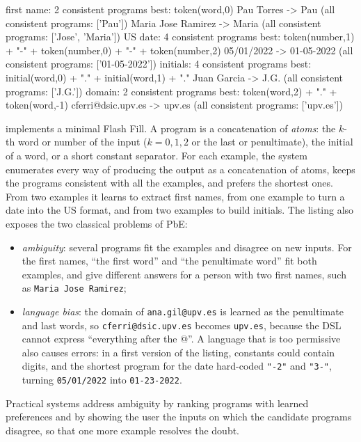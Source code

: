 \begin{pyoutput}
first name: 2 consistent programs
    best: token(word,0)
    Pau Torres -> Pau   (all consistent programs: ['Pau'])
    Maria Jose Ramirez -> Maria   (all consistent programs: ['Jose', 'Maria'])
US date: 4 consistent programs
    best: token(number,1) + "-" + token(number,0) + "-" + token(number,2)
    05/01/2022 -> 01-05-2022   (all consistent programs: ['01-05-2022'])
initials: 4 consistent programs
    best: initial(word,0) + "." + initial(word,1) + "."
    Juan Garcia -> J.G.   (all consistent programs: ['J.G.'])
domain: 2 consistent programs
    best: token(word,2) + "." + token(word,-1)
    cferri@dsic.upv.es -> upv.es   (all consistent programs: ['upv.es'])
\end{pyoutput}

 implements a minimal Flash Fill. A program is a concatenation of \emph{atoms}: the
$k$-th word or number of the input ($k=0,1,2$ or the last or penultimate), the initial of a word, or a
short constant separator. For each example, the system enumerates every way of producing the output as
a concatenation of atoms, keeps the programs consistent with all the examples, and prefers the shortest
ones. From two examples it learns to extract first names, from one example to turn a date into the US
format, and from two examples to build initials. The listing also exposes the two classical problems of
PbE:
\begin{itemize}
  \item \emph{ambiguity}: several programs fit the examples and disagree on new inputs. For the first
        names, ``the first word'' and ``the penultimate word'' fit both examples, and give different
        answers for a person with two first names, such as \texttt{Maria Jose Ramirez};
  \item \emph{language bias}: the domain of \texttt{ana.gil@upv.es} is learned as the penultimate and
        last words, so \texttt{cferri@dsic.upv.es} becomes \texttt{upv.es}, because the DSL cannot express
        ``everything after the @''. A language that is too permissive also causes errors: in a first version of the listing,
        constants could contain digits, and the shortest program for the date hard-coded \texttt{"-2"}
        and \texttt{"3-"}, turning \texttt{05/01/2022} into \texttt{01-23-2022}.
\end{itemize}
Practical systems address ambiguity by ranking programs with learned preferences and by showing the
user the inputs on which the candidate programs disagree, so that one more example resolves the
doubt.

